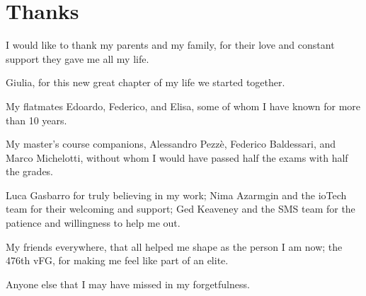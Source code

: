
\chapter*{Thanks}

I would like to thank my parents and my family, for their love and constant support they gave me all my life.

\FLOATverticalspace{12px}

Giulia, for this new great chapter of my life we started together.

\FLOATverticalspace{12px}

My flatmates Edoardo, Federico, and Elisa, some of whom I have known for more than 10 years.

\FLOATverticalspace{12px}

My master's course companions, Alessandro Pezzè, Federico Baldessari, and Marco Michelotti, without whom I would have passed half the exams with half the grades.

\FLOATverticalspace{12px}

Luca Gasbarro for truly believing in my work; Nima Azarmgin and the ioTech team for their welcoming and support; Ged Keaveney and the SMS team for the patience and willingness to help me out.

\FLOATverticalspace{12px}

My friends everywhere, that all helped me shape as the person I am now; the 476th vFG, for making me feel like part of an elite.

\FLOATverticalspace{12px}

Anyone else that I may have missed in my forgetfulness.
